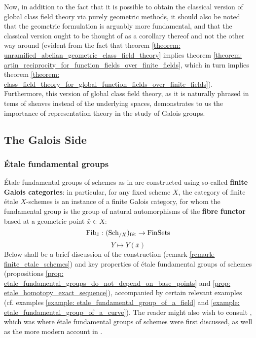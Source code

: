         Now, in addition to the fact that it is possible to obtain the classical version of global class field theory via purely geometric methods, it should also be noted that the geometric formulation is arguably more fundamental, and that the classical version ought to be thought of as a corollary thereof and not the other way around (evident from the fact that theorem \ref{theorem: unramified_abelian_geometric_class_field_theory} implies theorem \ref{theorem: artin_reciprocity_for_function_fields_over_finite_fields}, which in turn implies theorem \ref{theorem: class_field_theory_for_global_function_fields_over_finite_fields}). Furthermore, this version of global class field theory, as it is naturally phrased in tems of sheaves instead of the underlying spaces, demonstrates to us the importance of representation theory in the study of Galois groups.
      
    \subsection{The Galois Side}
        \subsubsection{\'Etale fundamental groups}
            \'Etale fundamental groups of schemes as in \cite[Expos\'e V]{SGA1} are constructed using so-called \textbf{finite Galois categories}: in particular, for any fixed scheme $X$, the category of finite \'etale $X$-schemes is an instance of a finite Galois category, for whom the fundamental group is the group of natural automorphisms of the \textbf{fibre functor} based at a geometric point $\bar{x} \in X$:
                $$\mathrm{Fib}_{\bar{x}}: (\mathrm{Sch}_{/X})_{\mathrm{f\acute{e}t}} \to \mathrm{Fin}\mathrm{Sets}$$
                $$Y \mapsto Y(\bar{x})$$
            Below shall be a brief discussion of the construction (remark \ref{remark: finite_etale_schemes}) and key properties of \'etale fundamental groups of schemes (propositions \ref{prop: etale_fundamental_groups_do_not_depend_on_base_points} and \ref{prop: etale_homotopy_exact_sequence}), accompanied by certain relevant examples (cf. examples \ref{example: etale_fundamental_group_of_a_field} and \ref{example: etale_fundamental_group_of_a_curve}). The reader might also wish to consult \cite[Expos\'e V]{SGA1}, which was where \'etale fundamental groups of schemes were first discussed, as well as the more modern account in \cite[\href{https://stacks.math.columbia.edu/tag/0BQ6}{Tag 0BQ6}]{stacks}.
            
